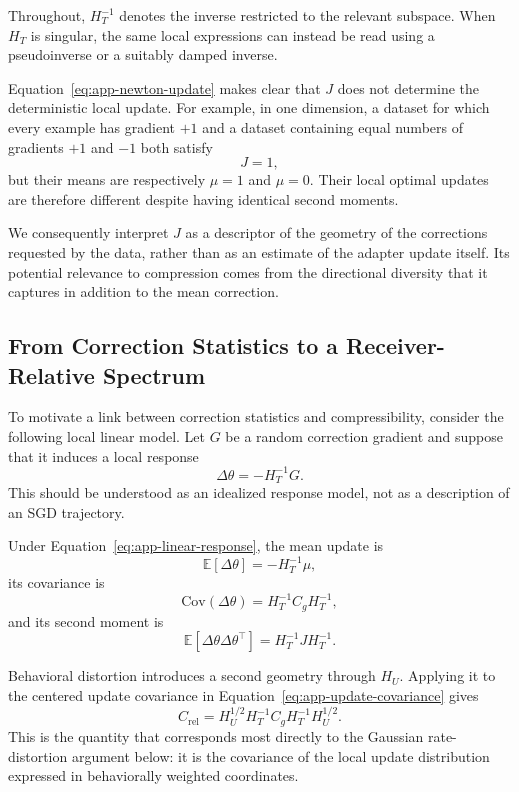 Throughout, $H_T^{-1}$ denotes the inverse restricted to the relevant
subspace. When $H_T$ is singular, the same local expressions can instead be
read using a pseudoinverse or a suitably damped inverse.

Equation~\ref{eq:app-newton-update} makes clear that $J$ does not determine the
deterministic local update.
For example, in one dimension, a dataset for which every example has gradient
$+1$ and a dataset containing equal numbers of gradients $+1$ and $-1$ both
satisfy
\[
    J=1,
\]
but their means are respectively $\mu=1$ and $\mu=0$.
Their local optimal updates are therefore different despite having identical
second moments.

We consequently interpret $J$ as a descriptor of the geometry of the
corrections requested by the data, rather than as an estimate of the adapter
update itself.
Its potential relevance to compression comes from the directional diversity
that it captures in addition to the mean correction.

\subsection{From Correction Statistics to a Receiver-Relative Spectrum}
\label{app:relative-spectrum}

To motivate a link between correction statistics and compressibility, consider
the following local linear model.
Let $G$ be a random correction gradient and suppose that it induces a local
response
\begin{equation}
    \Delta\theta=-H_T^{-1}G.
    \label{eq:app-linear-response}
\end{equation}
This should be understood as an idealized response model, not as a description
of an SGD trajectory.

Under Equation~\ref{eq:app-linear-response}, the mean update is
\[
    \mathbb{E}[\Delta\theta]
    =
    -H_T^{-1}\mu,
\]
its covariance is
\begin{equation}
    \mathrm{Cov}(\Delta\theta)
    =
    H_T^{-1}C_gH_T^{-1},
    \label{eq:app-update-covariance}
\end{equation}
and its second moment is
\begin{equation}
    \mathbb{E}[
        \Delta\theta\Delta\theta^\top
    ]
    =
    H_T^{-1}JH_T^{-1}.
    \label{eq:app-update-second-moment}
\end{equation}

Behavioral distortion introduces a second geometry through $H_U$.
Applying it to the centered update covariance in
Equation~\ref{eq:app-update-covariance} gives
\begin{equation}
    C_{\mathrm{rel}}
    =
    H_U^{1/2}
    H_T^{-1}
    C_g
    H_T^{-1}
    H_U^{1/2}.
    \label{eq:app-relative-covariance}
\end{equation}
This is the quantity that corresponds most directly to the Gaussian
rate-distortion argument below: it is the covariance of the local update
distribution expressed in behaviorally weighted coordinates.

